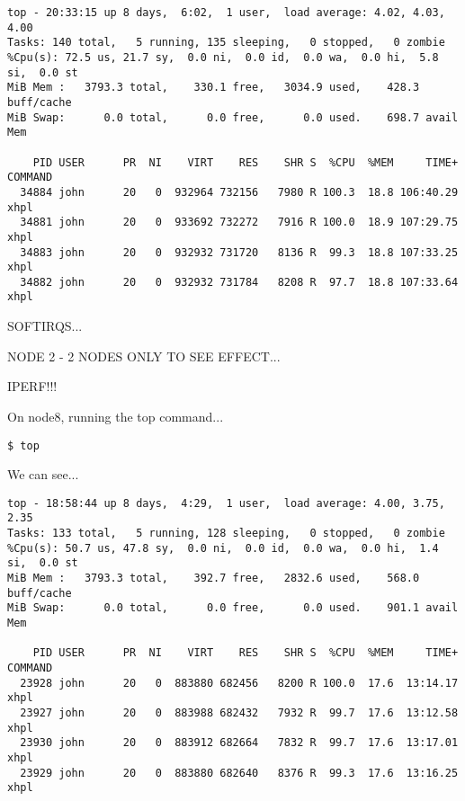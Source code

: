 \lstset{style=type}
\begin{lstlisting}
top - 20:33:15 up 8 days,  6:02,  1 user,  load average: 4.02, 4.03, 4.00
Tasks: 140 total,   5 running, 135 sleeping,   0 stopped,   0 zombie
%Cpu(s): 72.5 us, 21.7 sy,  0.0 ni,  0.0 id,  0.0 wa,  0.0 hi,  5.8 si,  0.0 st
MiB Mem :   3793.3 total,    330.1 free,   3034.9 used,    428.3 buff/cache
MiB Swap:      0.0 total,      0.0 free,      0.0 used.    698.7 avail Mem 

    PID USER      PR  NI    VIRT    RES    SHR S  %CPU  %MEM     TIME+ COMMAND                                                   
  34884 john      20   0  932964 732156   7980 R 100.3  18.8 106:40.29 xhpl                                                      
  34881 john      20   0  933692 732272   7916 R 100.0  18.9 107:29.75 xhpl                                                      
  34883 john      20   0  932932 731720   8136 R  99.3  18.8 107:33.25 xhpl                                                      
  34882 john      20   0  932932 731784   8208 R  97.7  18.8 107:33.64 xhpl                                                      
\end{lstlisting}

SOFTIRQS...


NODE 2 - 2 NODES ONLY TO SEE EFFECT...

IPERF!!!

On node8, running the top command...

\lstset{style=type}
\begin{lstlisting}
$ top
\end{lstlisting}

We can see...

\lstset{style=type}
\begin{lstlisting}
top - 18:58:44 up 8 days,  4:29,  1 user,  load average: 4.00, 3.75, 2.35
Tasks: 133 total,   5 running, 128 sleeping,   0 stopped,   0 zombie
%Cpu(s): 50.7 us, 47.8 sy,  0.0 ni,  0.0 id,  0.0 wa,  0.0 hi,  1.4 si,  0.0 st
MiB Mem :   3793.3 total,    392.7 free,   2832.6 used,    568.0 buff/cache
MiB Swap:      0.0 total,      0.0 free,      0.0 used.    901.1 avail Mem 

    PID USER      PR  NI    VIRT    RES    SHR S  %CPU  %MEM     TIME+ COMMAND                                                   
  23928 john      20   0  883880 682456   8200 R 100.0  17.6  13:14.17 xhpl                                                      
  23927 john      20   0  883988 682432   7932 R  99.7  17.6  13:12.58 xhpl                                                      
  23930 john      20   0  883912 682664   7832 R  99.7  17.6  13:17.01 xhpl                                                      
  23929 john      20   0  883880 682640   8376 R  99.3  17.6  13:16.25 xhpl  
\end{lstlisting}

